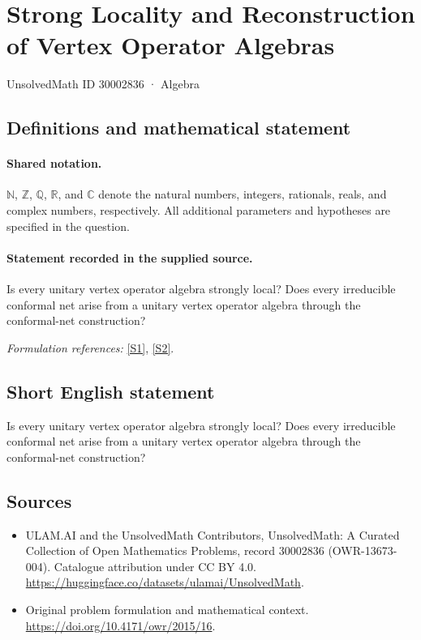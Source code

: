 \documentclass[11pt]{article}
\newcommand{\sref}[2]{\hyperlink{source:#1:#2}{[S#2]}}
\begin{document}
\setcounter{section}{30002835}
\section{Strong Locality and Reconstruction of Vertex Operator Algebras}\label{30002836}
{\small UnsolvedMath ID 30002836 · Algebra}
\subsection{Definitions and mathematical statement}

\paragraph{Shared notation.}$\mathbb N$, $\mathbb Z$, $\mathbb Q$, $\mathbb R$, and $\mathbb C$ denote the natural numbers, integers, rationals, reals, and complex numbers, respectively. All additional parameters and hypotheses are specified in the question.


\paragraph{Statement recorded in the supplied source.}
Is every unitary vertex operator algebra strongly local? Does every irreducible conformal net arise from a unitary vertex operator algebra through the conformal-net construction?
\par\smallskip\textit{Formulation references:} \sref{30002836}{1}, \sref{30002836}{2}.
\subsection{Short English statement}
Is every unitary vertex operator algebra strongly local? Does every irreducible conformal net arise from a unitary vertex operator algebra through the conformal-net construction?
\subsection{Sources}
\begin{itemize}
\item[\hypertarget{source:30002836:1}{S1}] ULAM.AI and the UnsolvedMath Contributors, UnsolvedMath: A Curated Collection of Open Mathematics Problems, record 30002836 (OWR-13673-004). Catalogue attribution under CC BY 4.0.
\url{https://huggingface.co/datasets/ulamai/UnsolvedMath}.
\item[\hypertarget{source:30002836:2}{S2}] Original problem formulation and mathematical context.
\url{https://doi.org/10.4171/owr/2015/16}.
\end{itemize}
\label{end:30002836}
\end{document}
